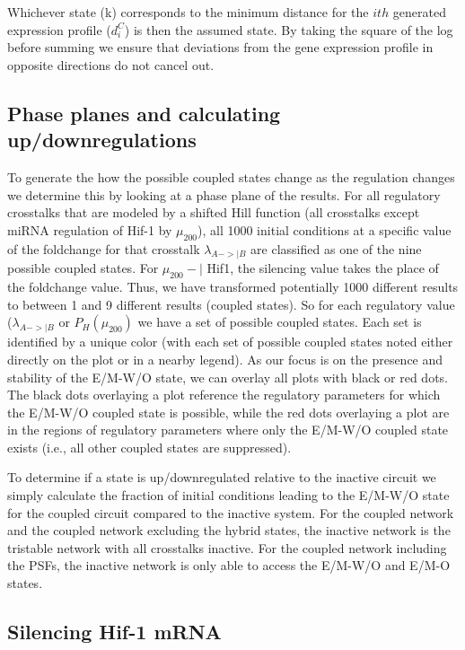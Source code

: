 \documentclass{article}
\begin{document}
Whichever state (k) corresponds to the minimum distance for the $ith$ generated expression profile ($d_i^C$) is then the assumed state. 
By taking the square of the log before summing we ensure that deviations from the gene expression profile in opposite directions do not cancel out.

\subsection{Phase planes and calculating up/downregulations}
To generate the how the possible coupled states change as the regulation changes we determine this by looking at a phase plane of the results.
For all regulatory crosstalks that are modeled by a shifted Hill function (all crosstalks except miRNA regulation of Hif-1 by $\mu_{200}$), all 1000 initial conditions at a specific value of the foldchange for that crosstalk $\lambda_{A->|B}$ are classified as one of the nine possible coupled states.
For $\mu_{200}-|$ Hif1, the silencing value takes the place of the foldchange value. 
Thus, we have transformed potentially 1000 different  results to between 1 and 9 different results (coupled states). 
So for each regulatory value ($\lambda_{A->|B}$ or $P_H(\mu_{200})$ we have a set of possible coupled states. 
Each set is identified by a unique color (with each set of possible coupled states noted either directly on the plot or in a nearby legend).
As our focus is on the presence and stability of the E/M-W/O state, we can overlay all plots with black or red dots. 
The black dots overlaying a plot reference the regulatory parameters for which the E/M-W/O coupled state is possible, while the red dots overlaying a plot are in the regions of regulatory parameters where only the E/M-W/O coupled state exists (i.e., all other coupled states are suppressed).

To determine if a state is up/downregulated relative to the inactive circuit we simply calculate the fraction of initial conditions leading to the E/M-W/O state for the coupled circuit compared to the inactive system. 
For the coupled network and the coupled network excluding the hybrid states, the inactive network is the tristable network with all crosstalks inactive. 
For the coupled network including the PSFs, the inactive network is only able to access the E/M-W/O and E/M-O states. 




\subsection{Silencing Hif-1 mRNA}
\end{document}
